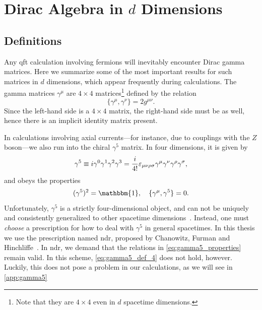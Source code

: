 \chapter{Dirac Algebra in \texorpdfstring{$d$}{d} Dimensions}\label{app:dirac_algebra}
\section{Definitions}\label{app:gamma_def}
Any \gls{qft} calculation involving fermions will inevitably encounter Dirac gamma matrices. Here we summarize some of the most important results for such matrices in $d$ dimensions, which appear frequently during calculations.
The gamma matrices $\gamma^\mu$ are $4\times4$ matrices\footnote{Note that they are $4\times4$ even in $d$ spacetime dimensions.} defined by the relation
\begin{equation}\label{eq:dirac_algebra}
    \{\gamma^\mu,\gamma^\nu\} = 2g^{\mu\nu}.
\end{equation}
Since the left-hand side is a $4\times4$ matrix, the right-hand side must be as well, hence there is an implicit identity matrix present.

In calculations involving axial currents---for instance, due to couplings with the $Z$ boson---we also run into the chiral $\gamma^5$ matrix. In four dimensions, it is given by
\begin{equation}\label{eq:gamma5_def_4}
    \gamma^5 \equiv i\gamma^0\gamma^1\gamma^2\gamma^3 = \frac{i}{4!}\varepsilon_{\mu\nu\rho\sigma}\gamma^\mu\gamma^\nu\gamma^\rho\gamma^\sigma,
\end{equation}
and obeys the properties
\begin{equation}\label{eq:gamma5_properties}
    (\gamma^5)^2=\mathbbm{1}, \quad \{\gamma^\mu,\gamma^5\} = 0.
\end{equation}
Unfortunately, $\gamma^5$ is a strictly four-dimensional object, and can not be uniquely and consistently generalized to other spacetime dimensions~\cite{Denner:2019vbn}. Instead, one must \emph{choose} a prescription for how to deal with $\gamma^5$ in general spacetimes.
In this thesis we use the prescription named \acrfull{ndr}, proposed by Chanowitz, Furman and Hinchliffe~\cite{Chanowitz:1979zu}.
In \gls{ndr}, we demand that the relations in \cref{eq:gamma5_properties} remain valid. In this scheme, \cref{eq:gamma5_def_4} does not hold, however.
Luckily, this does not pose a problem in our calculations, as we will see in \cref{app:gamma5}

